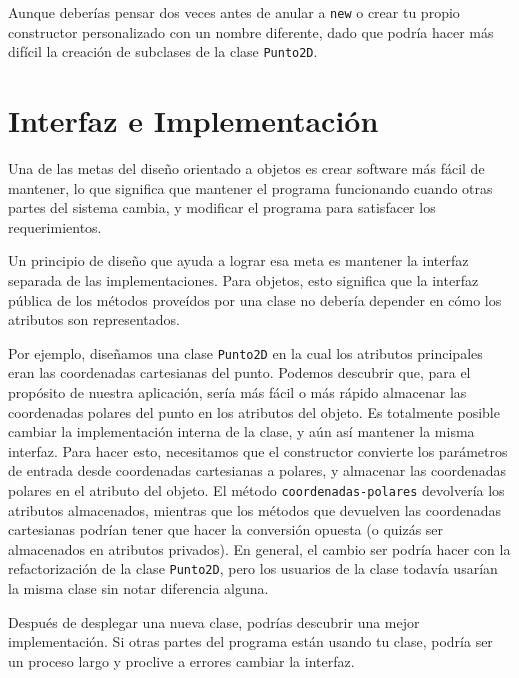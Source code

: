 Aunque deberías pensar dos veces antes de anular a {\tt new} 
o crear tu propio constructor personalizado con un nombre diferente,
dado que podría hacer más difícil la creación de subclases de la 
clase {\tt Punto2D}.



\section{Interfaz e Implementación}

Una de las metas del diseño orientado a objetos es crear software
más fácil de mantener, lo que significa que mantener el programa
funcionando cuando otras partes del sistema cambia, y modificar el 
programa para satisfacer los requerimientos.

Un principio de diseño que ayuda a lograr esa meta es mantener
la interfaz separada de las implementaciones. Para objetos, esto
significa que la interfaz pública de los métodos proveídos por una
clase no debería depender en cómo los atributos son representados.

Por ejemplo, diseñamos una clase {\tt Punto2D} en la cual los
atributos principales eran las coordenadas cartesianas del punto.
Podemos descubrir que, para el propósito de nuestra aplicación,
sería más fácil o más rápido almacenar las coordenadas polares del
punto en los atributos del objeto. Es totalmente posible cambiar
la implementación interna de la clase, y aún así mantener
la misma interfaz. Para hacer esto, necesitamos que el constructor
convierte los parámetros de entrada desde coordenadas cartesianas
a polares, y almacenar las coordenadas polares en el
atributo del objeto. El método {\tt coordenadas-polares} devolvería
los atributos almacenados, mientras que los métodos que 
devuelven las coordenadas cartesianas podrían tener que hacer la 
conversión opuesta (o quizás ser almacenados en atributos privados).
En general, el cambio ser podría hacer con la refactorización  
de la clase {\tt Punto2D}, pero los usuarios de la clase todavía
usarían la misma clase sin notar diferencia alguna.

Después de desplegar una nueva clase, podrías descubrir 
una mejor implementación. Si otras partes del programa están
usando tu clase, podría ser un proceso largo y proclive a errores
cambiar la interfaz.

